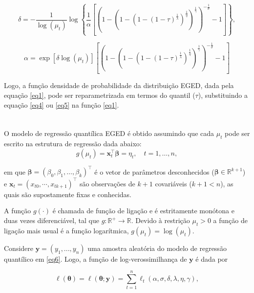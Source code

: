 \documentclass{sciposter}
\begin{document}
\begin{multicols}{3}
{\begin{equation}\label{eq4}
\delta=-\frac{1}{\log(\mu_t)}\log\left\{\frac{1}{\alpha}\left[\left(1-\left(1-\left(1-\left(1-\tau\right)^\frac{1}{\lambda}\right)^\frac{1}{\eta}\right)^{\frac{1}{\gamma}}\right)^{-\frac{1}{\sigma}}-1\right]\right\},
\end{equation}


\begin{equation}\label{eq5}
\alpha=\exp\left[\delta\log(\mu_t)\right]\left[\left(1-\left(1-\left(1-\left(1-\tau\right)^\frac{1}{\lambda}\right)^\frac{1}{\eta}\right)^{\frac{1}{\gamma}}\right)^{-\frac{1}{\sigma}}-1\right]
\end{equation}

Logo, a função densidade de probabilidade da distribuição EGED, dada pela equação \eqref{eq1}, pode ser reparametrizada em termos do quantil ($\tau$), substituindo a equação \eqref{eq4} ou \eqref{eq5} na função \eqref{eq1}.
\vspace{4cm}

\section*{}
\vspace{0.2cm}

O modelo de regressão quantílica EGED é obtido assumindo que cada ${\mu_t}$ pode ser escrito na estrutura de regressão dada abaixo: 
\begin{equation}\label{eq6}
 g(\mu_t)=\bm{x}_t^{\top}\bm{\beta}=\eta_t, \quad t=1, \ldots, n,
\end{equation}

em que $\bm{\beta}=(\beta_0,\beta_1, \ldots, \beta_k)^{\top}$  é o vetor de parâmetros desconhecidos ($\bm{\beta}\in\mathbb{R}^{k+1}$) e $\bm{x}_{t}=({x_{t0}},\cdots,{x_{tk+1}})^\top$ são observações de $k+1$ covariáveis ($k+1<n$), as quais são supostamente fixas e conhecidas. 

A função $g(\cdot)$ é chamada de função de ligação e é estritamente monótona e duas vezes diferenciável, tal que $g:\mathbb{R}^{+}\rightarrow \mathbb{R}$. Devido à restrição $\mu_t > 0$ a função de ligação mais usual é a função logarítmica, $g(\mu_t)=\log(\mu_t)$.

Considere $\bm{y}=(y_1,...,y_n)$ uma amostra aleatória do modelo de regressão quantílico em \eqref{eq6}. Logo, a função de log-verossimilhança de $\bm{y}$ é dada por
 
\vspace{-0.5cm} $$\ell(\bm{\theta})=\ell(\bm{\theta};\bm{y})=\sum_{t=1}^{n}\ell_t(\alpha,\sigma,\delta,\lambda,\eta,\gamma),$$

}
\end{multicols}
\end{document}
